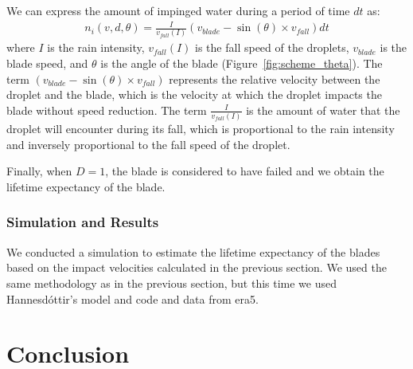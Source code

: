 \documentclass[10pt]{report}
\begin{document}
We can express the amount of impinged water during a period of time $dt$ as:
\begin{align}
    n_i(v,d,\theta) = \frac{I}{v_{fall}(I)} (v_{blade} - \sin(\theta)\times v_{fall}) dt
\end{align} 
where $I$ is the rain intensity, $v_{fall}(I)$ is the fall speed of the droplets, $v_{blade}$ is the blade speed, and $\theta$ is the angle of the blade (Figure~\ref{fig:scheme_theta}). The term $(v_{blade} - \sin(\theta)\times v_{fall})$ represents the relative velocity between the droplet and the blade, which is the velocity at which the droplet impacts the blade without speed reduction. The term $\frac{I}{v_{fall}(I)}$ is the amount of water that the droplet will encounter during its fall, which is proportional to the rain intensity and inversely proportional to the fall speed of the droplet.

Finally, when $D=1$, the blade is considered to have failed and we obtain the lifetime expectancy of the blade.

\subsubsection*{Simulation and Results}
We conducted a simulation to estimate the lifetime expectancy of the blades based on the impact velocities calculated in the previous section. We used the same methodology as in the previous section, but this time we used Hannesdóttir's model and code \cite{hannesdottir2024} and data from era5.

\section*{Conclusion}


\end{document}
